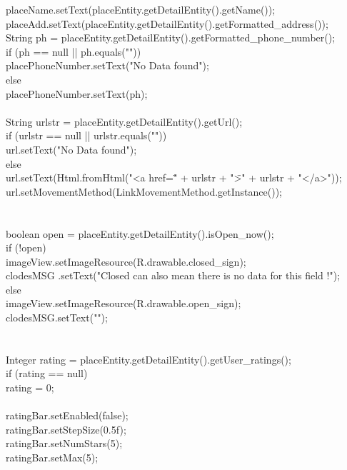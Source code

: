 \documentclass[12pt,a4paper]{article}
\begin{document}
{{{		placeName.setText(placeEntity.getDetailEntity().getName());\\
		placeAdd.setText(placeEntity.getDetailEntity().getFormatted_address());\\
		String ph = placeEntity.getDetailEntity().getFormatted_phone_number();\\
		if (ph == null || ph.equals("")) {\\
			placePhoneNumber.setText("No Data found");\\
		} else {\\
			placePhoneNumber.setText(ph);\\
		}\\
		String urlstr = placeEntity.getDetailEntity().getUrl();\\
		if (urlstr == null || urlstr.equals("")) {\\
			url.setText("No Data found");\\
		} else {\\
			url.setText(Html.fromHtml("<a href=\"" + urlstr + "\">" + urlstr
					+ "</a>"));\\
			url.setMovementMethod(LinkMovementMethod.getInstance());\\
		}\\
\\
		boolean open = placeEntity.getDetailEntity().isOpen_now();\\
		if (!open) {\\
			imageView.setImageResource(R.drawable.closed_sign);\\
			clodesMSG
					.setText("Closed can also mean there is no data for this field !");\\
		} else {\\
			imageView.setImageResource(R.drawable.open_sign);\\
			clodesMSG.setText("");\\
		}\\
\\
		Integer rating = placeEntity.getDetailEntity().getUser_ratings();\\
		if (rating == null) {\\
			rating = 0;\\
		}\\
		ratingBar.setEnabled(false);\\
		ratingBar.setStepSize(0.5f);\\
		ratingBar.setNumStars(5);\\
		ratingBar.setMax(5);\\

}}}
\end{document}
